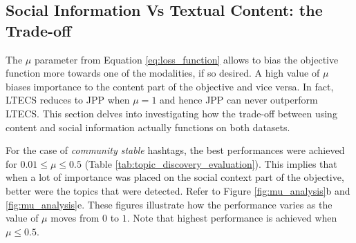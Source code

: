 \subsection{Social Information Vs Textual Content: the Trade-off}
\label{subsec:parameter_analysis}
The $\mu$ parameter from Equation \ref{eq:loss_function} allows to
bias the objective function more
towards one of the modalities, if so desired.  A high value of $\mu$ biases importance to the content part of
the objective and vice versa.  In fact, LTECS reduces to JPP when $\mu = 1$ and hence JPP can never
outperform LTECS.  This section delves into investigating how the trade-off between using content and social information
actually functions on both datasets. 

For the case of \emph{community stable} hashtags, the best performances
were achieved for $0.01 \leq \mu \leq 0.5$ (Table \ref{tab:topic_discovery_evaluation}).
This implies that when a lot of importance was placed on the social context part
of the objective, better were the topics that were detected. Refer to Figure \ref{fig:mu_analysis}b
and \ref{fig:mu_analysis}e.  These figures illustrate how the performance varies as the value of $\mu$
moves from $0$ to $1$.  Note that highest performance is achieved when $\mu \leq 0.5$.

